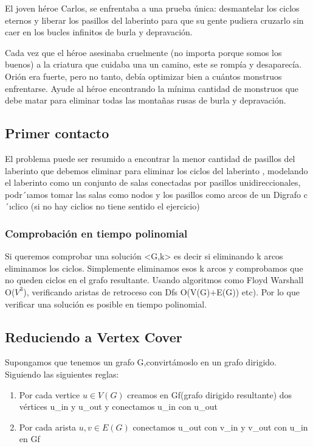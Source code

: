 \documentclass{article}
\begin{document}
El joven héroe Carlos, se enfrentaba a una prueba única: desmantelar los ciclos eternos y liberar los pasillos del laberinto para que su gente pudiera cruzarlo sin caer en los bucles infinitos de burla y depravación.

Cada vez que el héroe asesinaba cruelmente (no importa porque somos los buenos) a la criatura que cuidaba una un camino, este se rompía y desaparecía. Orión era fuerte, pero no tanto, debía optimizar bien a cuántos monstruos enfrentarse. Ayude al héroe encontrando la mínima cantidad de monstruos que debe matar para eliminar todas las montañas rusas de burla y depravación.
	\subsection{Primer contacto}
	El problema puede ser resumido a encontrar la menor cantidad de pasillos del
laberinto que debemos eliminar para eliminar los ciclos del laberinto , modelando el laberinto como un conjunto de salas conectadas por pasillos unidireccionales, podr´ıamos tomar las salas como nodos y los pasillos como arcos de un Digrafo c´ıclico (si no hay ciclios no tiene sentido el ejercicio)
	\subsubsection{Comprobación en tiempo polinomial}
	Si queremos comprobar una solución <G,k> es decir si eliminando k arcos eliminamos los ciclos. Simplemente eliminamos esos k arcos y comprobamos que no queden ciclos en el grafo resultante. Usando algoritmos como Floyd Warshall O($V^3$), verificando aristas de retroceso con Dfs O(V(G)+E(G)) etc). Por lo que verificar una solución es posible en tiempo polinomial.
	\subsection{Reduciendo a Vertex Cover}
Supongamos que tenemos un grafo G,convirtámoslo en un grafo dirigido.
Siguiendo las siguientes reglas:

\begin{enumerate}
  \item Por cada vertice $u \in V(G)$ creamos en Gf(grafo dirigido resultante) dos vértices u\_in y u\_out y conectamos u\_in con u\_out
  \item Por cada arista ${u,v} \in E(G)$ conectamos u\_out con v\_in y v\_out con u\_in en Gf
\end{enumerate}
\end{document}
